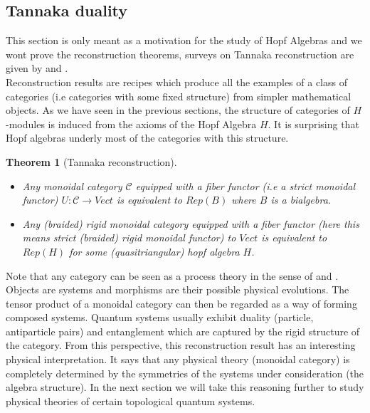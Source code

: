 \documentclass{article}
\newtheorem{theorem}{Theorem}
\newcommand{\cat}{\mathcal{C}}
\begin{document}
\subsection{Tannaka duality}
This section is only meant as a motivation for the study of Hopf Algebras and we wont prove the reconstruction theorems, surveys on Tannaka reconstruction are given by \cite{Vercruysse12} and \cite{Joyal91}.\\
Reconstruction results are recipes which produce all the examples of a class of categories (i.e categories with some fixed structure) from simpler mathematical objects. As we have seen in the previous sections, the structure of categories of $H$-modules is induced from the axioms of the Hopf Algebra $H$. It is surprising that Hopf algebras underly most of the categories with this structure.
\begin{theorem}[Tannaka reconstruction]
	\begin{itemize}
		\item Any monoidal category $\cat$ equipped with a fiber functor (i.e a strict monoidal functor) $U: \cat \rightarrow Vect$ is equivalent to $Rep(B)$ where $B$ is a bialgebra.
		\item Any (braided) rigid monoidal category equipped with a fiber functor (here this means strict (braided) rigid monoidal functor) to $Vect$ is equivalent to $Rep(H)$ for some (quasitriangular) hopf algebra $H$.
	\end{itemize}
\end{theorem}
Note that any category can be seen as a process theory in the sense of \cite{Abramsky04} and \cite{Coecke17}. Objects are systems and morphisms are their possible physical evolutions. The tensor product of a monoidal category can then be regarded as a way of forming composed systems. Quantum systems usually exhibit duality (particle, antiparticle pairs) and entanglement which are captured by the rigid structure of the category. From this perspective, this reconstruction result has an interesting physical interpretation. It says that any physical theory (monoidal category) is completely determined by the symmetries of the systems under consideration (the algebra structure). In the next section we will take this reasoning further to study physical theories of certain topological quantum systems.\\
\end{document}
